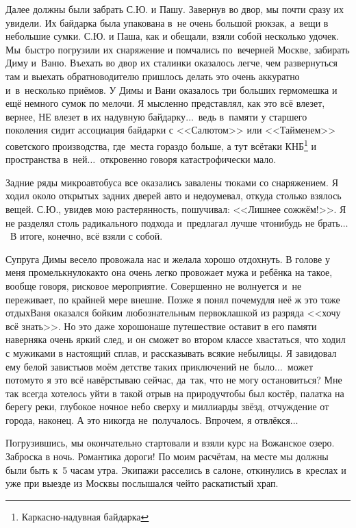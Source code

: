 \renewcommand*{\thefootnote}{\fnsymbol{footnote}}
Далее должны были забрать С.Ю. и Пашу. Завернув во двор, мы почти сразу их увидели. Их байдарка была упакована в~не очень большой рюкзак, а~вещи в небольшие сумки. С.Ю. и Паша, как и обещали, взяли собой несколько удочек. Мы~быстро погрузили их снаряжение и помчались по~вечерней Москве, забирать Диму и~Ваню. Въехать во двор их сталинки оказалось легче, чем развернуться там и выехать обратно\mdash водителю пришлось делать это очень аккуратно и~в~несколько приёмов. У Димы и Вани оказалось три больших гермомешка и ещё немного сумок по мелочи. Я мысленно представлял, как это всё влезет, вернее, НЕ влезет в их надувную байдарку$\ldots$~ведь в~памяти у старшего поколения сидит ассоциация байдарки с <<Салютом>> или <<Тайменем>> советского производства, где~места гораздо больше, а тут всё\sdash таки КНБ\footnote[1]{Каркасно-надувная байдарка} и пространства в~ней$\ldots$~откровенно говоря катастрофически мало.

Задние ряды микроавтобуса все оказались завалены тюками со снаряжением. Я ходил около открытых задних дверей авто и недоумевал, откуда столько взялось вещей. С.Ю., увидев мою растерянность, пошучивал: <<Лишнее сожжём!>>. Я не разделял столь радикального подхода и~предлагал лучше что\sdash нибудь не брать$\ldots$~В итоге, конечно, всё взяли с собой.

Супруга Димы весело провожала нас и желала хорошо отдохнуть. В голове у меня промелькнуло\mdash как\sdash то она очень легко провожает мужа и ребёнка на такое, вообще говоря, рисковое мероприятие. Совершенно не волнуется и~не переживает, по крайней мере внешне. Позже я понял почему\mdash для неё ж это тоже отдых\mdash Ваня оказался бойким любознательным первоклашкой из разряда <<хочу всё знать>>. Но это даже хорошо\mdash наше путешествие оставит в его памяти наверняка очень яркий след, и он сможет во втором классе хвастаться, что ходил с мужиками в настоящий сплав, и рассказывать всякие небылицы. Я завидовал ему белой завистью\mdash в моём детстве таких приключений не~было$\ldots$~может потому\sdash то я это всё навёрстываю сейчас, да~так, что не могу остановиться? Мне так всегда хотелось уйти в такой отрыв на природу\mdash чтобы был костёр, палатка на берегу реки, глубокое ночное небо сверху и миллиарды звёзд, отчуждение от города, наконец. А это никогда не~получалось. Впрочем, я отвлёкся$\ldots$

Погрузившись, мы окончательно стартовали и взяли курс на Вожанское озеро. Заброска в ночь. Романтика дороги! По моим расчётам, на месте мы должны были быть к~5\thinspace\nbdash{} часам утра. Экипажи расселись в салоне, откинулись в~креслах и уже при выезде из Москвы послышался чей\sdash то раскатистый храп.


